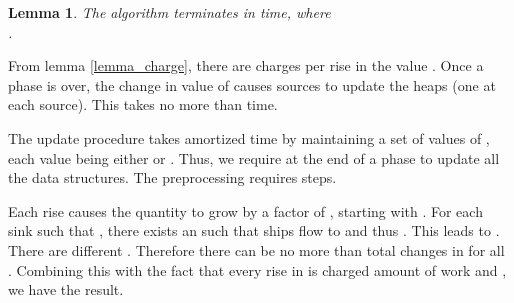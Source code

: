 \documentclass[11pt]{article}
\newenvironment{proof}{\par\noindent{\bf Proof:}}{\mbox{}\hfill\\}
\newtheorem{lemma}{Lemma}[section]
\newcounter{rem}
\begin{document}
\begin{lemma}
The algorithm terminates in  time, where\\ .
\end{lemma}

\begin{proof}
From lemma \ref{lemma_charge}, there are  charges per rise in  the  
value . Once a phase is over, the change in value of  causes sources to 
update the heaps (one at each source). This takes no more than  time.

The update  procedure takes  amortized time by maintaining a set of
values of  ,
each value being  either  or .
Thus, we require  at the end of a phase
to update all the data structures. The preprocessing requires  steps. 

Each rise causes the quantity  to grow by a factor of , starting with
. 
For each sink  such that , there exists an  such that  ships flow to  and  thus
. This  leads to . There are  different . Therefore
there can be no more than  total changes in   for all .  
Combining this with the fact that every rise in  is charged   amount
of work and , we have the result.
\end{proof}
\end{document}
